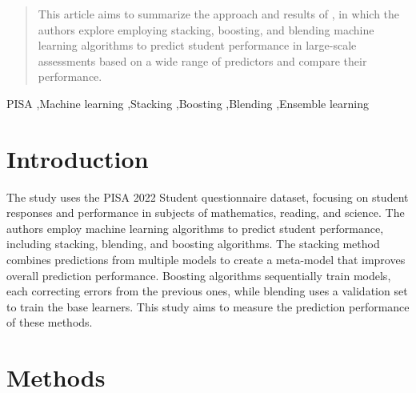 \documentclass[final,5p,times,twocolumn,authoryear]{elsarticle}
\begin{document}
\begin{frontmatter}


	\begin{abstract}
		This article aims to summarize the approach and results of \cite{Stacking}, in which the authors explore employing stacking, boosting, and blending machine learning algorithms to predict student performance in large-scale assessments based on a wide range of predictors and compare their performance.
	\end{abstract}

	\begin{keyword}
		PISA \sep Machine learning \sep Stacking \sep Boosting \sep Blending \sep Ensemble
		learning
	\end{keyword}

\end{frontmatter}




\section{Introduction}
\label{introduction}

The study \cite{Stacking} uses the PISA 2022 Student questionnaire dataset, focusing on student responses and performance in subjects of mathematics, reading, and science. The authors employ machine learning algorithms to predict student performance, including stacking, blending, and boosting algorithms. The stacking method combines predictions from multiple models to create a meta-model that improves overall prediction performance. Boosting algorithms sequentially train models, each correcting errors from the previous ones, while blending uses a validation set to train the base learners. This study aims to measure the prediction performance of these methods.






\section{Methods}
\end{document}
